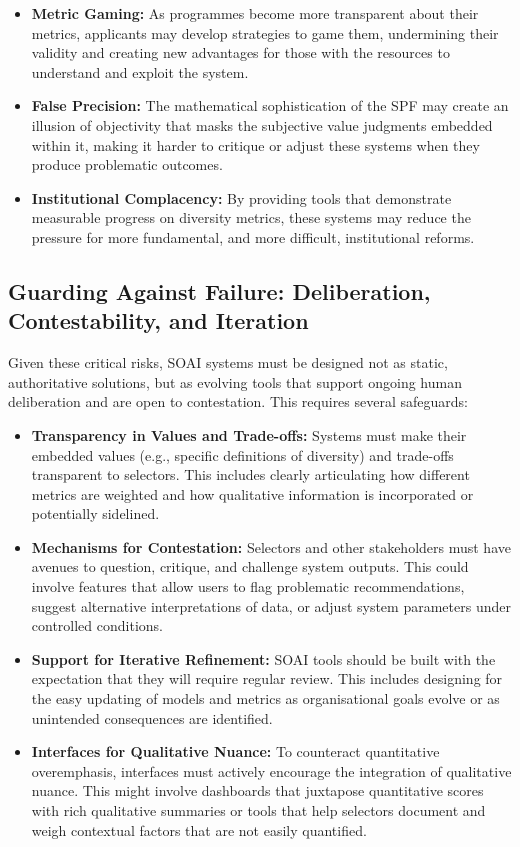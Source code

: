 \begin{itemize}
    \item \textbf{Metric Gaming:} As programmes become more transparent about their metrics, applicants may develop strategies to game them, undermining their validity and creating new advantages for those with the resources to understand and exploit the system.
    \item \textbf{False Precision:} The mathematical sophistication of the SPF may create an illusion of objectivity that masks the subjective value judgments embedded within it, making it harder to critique or adjust these systems when they produce problematic outcomes.
    \item \textbf{Institutional Complacency:} By providing tools that demonstrate measurable progress on diversity metrics, these systems may reduce the pressure for more fundamental, and more difficult, institutional reforms.
\end{itemize}

\subsection{Guarding Against Failure: Deliberation, Contestability, and Iteration}\label{ssec:deliberation_contestability_iteration}
Given these critical risks, SOAI systems must be designed not as static, authoritative solutions, but as evolving tools that support ongoing human deliberation and are open to contestation. This requires several safeguards:

\begin{itemize}
    \item \textbf{Transparency in Values and Trade-offs:} Systems must make their embedded values (e.g., specific definitions of diversity) and trade-offs transparent to selectors. This includes clearly articulating how different metrics are weighted and how qualitative information is incorporated or potentially sidelined.
    \item \textbf{Mechanisms for Contestation:} Selectors and other stakeholders must have avenues to question, critique, and challenge system outputs. This could involve features that allow users to flag problematic recommendations, suggest alternative interpretations of data, or adjust system parameters under controlled conditions.
    \item \textbf{Support for Iterative Refinement:} SOAI tools should be built with the expectation that they will require regular review. This includes designing for the easy updating of models and metrics as organisational goals evolve or as unintended consequences are identified.
    \item \textbf{Interfaces for Qualitative Nuance:} To counteract quantitative overemphasis, interfaces must actively encourage the integration of qualitative nuance. This might involve dashboards that juxtapose quantitative scores with rich qualitative summaries or tools that help selectors document and weigh contextual factors that are not easily quantified.
\end{itemize}

